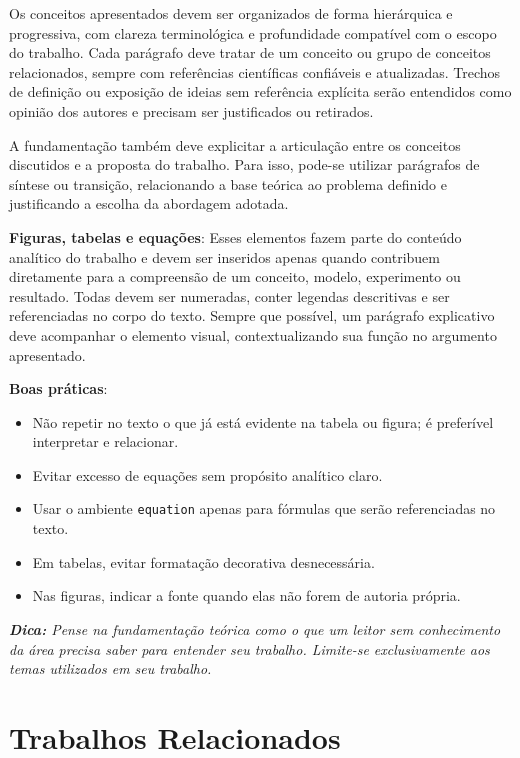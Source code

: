 \documentclass{eic-bcc-tcc}
\begin{document}
Os conceitos apresentados devem ser organizados de forma hierárquica e progressiva, com clareza terminológica e profundidade compatível com o escopo do trabalho. Cada parágrafo deve tratar de um conceito ou grupo de conceitos relacionados, sempre com referências científicas confiáveis e atualizadas. Trechos de definição ou exposição de ideias sem referência explícita serão entendidos como opinião dos autores e precisam ser justificados ou retirados.

A fundamentação também deve explicitar a articulação entre os conceitos discutidos e a proposta do trabalho. Para isso, pode-se utilizar parágrafos de síntese ou transição, relacionando a base teórica ao problema definido e justificando a escolha da abordagem adotada.

\textbf{Figuras, tabelas e equações}: Esses elementos fazem parte do conteúdo analítico do trabalho e devem ser inseridos apenas quando contribuem diretamente para a compreensão de um conceito, modelo, experimento ou resultado. Todas devem ser numeradas, conter legendas descritivas e ser referenciadas no corpo do texto. Sempre que possível, um parágrafo explicativo deve acompanhar o elemento visual, contextualizando sua função no argumento apresentado.

\textbf{Boas práticas}:
\begin{itemize}
    \item Não repetir no texto o que já está evidente na tabela ou figura; é preferível interpretar e relacionar.
    \item Evitar excesso de equações sem propósito analítico claro.
    \item Usar o ambiente \texttt{equation} apenas para fórmulas que serão referenciadas no texto.
    \item Em tabelas, evitar formatação decorativa desnecessária.
    \item Nas figuras, indicar a fonte quando elas não forem de autoria própria.
\end{itemize}

\textit{\textbf{Dica:} Pense na fundamentação teórica como o que um leitor sem conhecimento da área precisa saber para entender seu trabalho. Limite-se exclusivamente aos temas utilizados em seu trabalho.}


\chapter{Trabalhos Relacionados}
\label{cha:relacionados}
\end{document}
